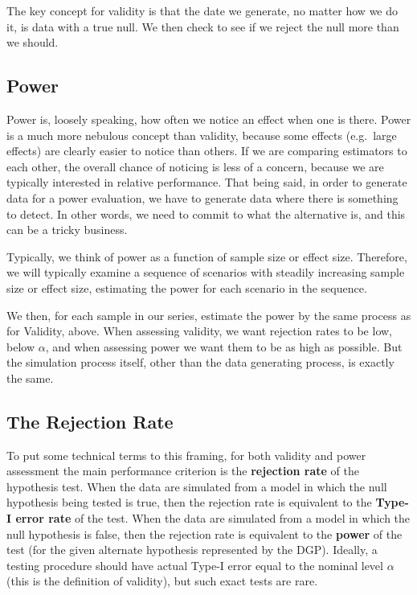 \documentclass[
]{book}
\begin{document}
The key concept for validity is that the date we generate, no matter how we do it, is data with a true null.
We then check to see if we reject the null more than we should.

\hypertarget{power}{%
\subsection{Power}\label{power}}

Power is, loosely speaking, how often we notice an effect when one is there.
Power is a much more nebulous concept than validity, because some effects (e.g.~large effects) are clearly easier to notice than others.
If we are comparing estimators to each other, the overall chance of noticing is less of a concern, because we are typically interested in relative performance.
That being said, in order to generate data for a power evaluation, we have to generate data where there is something to detect.
In other words, we need to commit to what the alternative is, and this can be a tricky business.

Typically, we think of power as a function of sample size or effect size. Therefore, we will typically examine a sequence of scenarios with steadily increasing sample size or effect size, estimating the power for each scenario in the sequence.

We then, for each sample in our series, estimate the power by the same process as for Validity, above.
When assessing validity, we want rejection rates to be low, below \(\alpha\), and when assessing power we want them to be as high as possible. But the simulation process itself, other than the data generating process, is exactly the same.

\hypertarget{the-rejection-rate}{%
\subsection{The Rejection Rate}\label{the-rejection-rate}}

To put some technical terms to this framing, for both validity and power assessment the main performance criterion is the \textbf{rejection rate} of the hypothesis test. When the data are simulated from a model in which the null hypothesis being tested is true, then the rejection rate is equivalent to the \textbf{Type-I error rate} of the test. When the data are simulated from a model in which the null hypothesis is false, then the rejection rate is equivalent to the \textbf{power} of the test (for the given alternate hypothesis represented by the DGP).
Ideally, a testing procedure should have actual Type-I error equal to the nominal level \(\alpha\) (this is the definition of validity), but such exact tests are rare.
\end{document}
